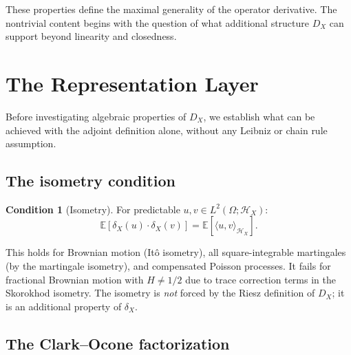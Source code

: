 \documentclass[11pt,a4paper]{article}
\theoremstyle{plain}
\theoremstyle{definition}
\newtheorem{condition}[theorem]{Condition}
\theoremstyle{remark}
\newcommand{\E}{\mathbb{E}}
\newcommand{\HX}{\mathcal{H}_X}
\begin{document}
These properties define the maximal generality of the operator derivative. The nontrivial content begins with the question of what additional structure $D_X$ can support beyond linearity and closedness.


\section{The Representation Layer}\label{sec:rep}

Before investigating algebraic properties of $D_X$, we establish what can be achieved with the adjoint definition alone, without any Leibniz or chain rule assumption.


\subsection{The isometry condition}

\begin{condition}[Isometry]\label{cond:iso}
For predictable $u, v \in L^2(\Omega; \HX)$:
\begin{equation}\label{eq:isometry}
\E[\delta_X(u) \cdot \delta_X(v)] = \E[\langle u, v \rangle_{\HX}].
\end{equation}
\end{condition}

This holds for Brownian motion (It\^o isometry), all square-integrable martingales (by the martingale isometry), and compensated Poisson processes. It fails for fractional Brownian motion with $H \neq 1/2$ due to trace correction terms in the Skorokhod isometry. The isometry is \emph{not} forced by the Riesz definition of $D_X$; it is an additional property of $\delta_X$.


\subsection{The Clark--Ocone factorization}
\end{document}
